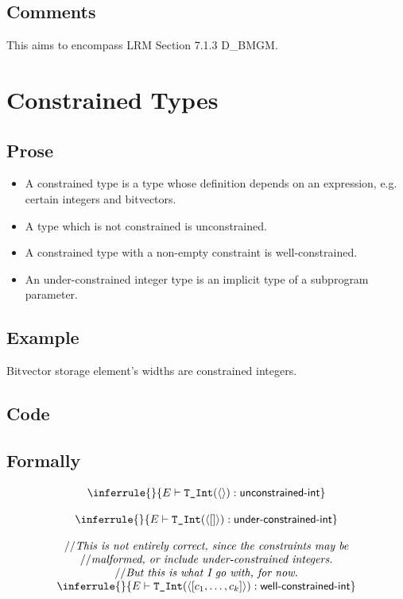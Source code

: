 \documentclass{book}
\newcommand\RuleComment[1]{// \textit{#1}}
\newcommand\isunconstrainedinteger[0]{\textsf{unconstrained-int}}
\newcommand\isunderconstrainedinteger[0]{\textsf{under-constrained-int}}
\newcommand\iswellconstrainedinteger[0]{\textsf{well-constrained-int}}
\newcommand\unconstrainedinteger[0]{\TInt(\langle\rangle)}
\begin{document}
  \subsection{Comments}
  This aims to encompass LRM Section 7.1.3 D\_BMGM.

\section{Constrained Types}

\subsection{Prose}
  \begin{itemize}
  \item A constrained type is a type whose definition depends on an expression, e.g. certain integers and bitvectors. 
  \item A type which is not constrained is unconstrained.
  \item A constrained type with a non-empty constraint is well-constrained.
  \item An under-constrained integer type is an implicit type of a subprogram parameter.
  \end{itemize}

  \subsection{Example}
    Bitvector storage element’s widths are constrained integers.  

  \subsection{Code}

\begin{emptyformal}
    \subsection{Formally}

\[
\begin{array}{c}
\inferrule{}{E \entails \unconstrainedinteger : \isunconstrainedinteger}\\
\\
\inferrule{}{E \entails \TInt(\langle [] \rangle) : \isunderconstrainedinteger}\\
\\
\RuleComment{This is not entirely correct, since the constraints may be}\\
\RuleComment{malformed, or include under-constrained integers.}\\
\RuleComment{But this is what I go with, for now.}\\
\inferrule{}{E \entails \TInt(\langle [c_1,\ldots,c_k]\rangle) : \iswellconstrainedinteger}
\end{array}
\]     
    
\end{emptyformal}
\end{document}
